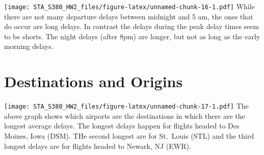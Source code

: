 \documentclass[]{article}
\newenvironment{Shaded}{\begin{snugshade}}{\end{snugshade}}
\newcommand{\KeywordTok}[1]{\textcolor[rgb]{0.13,0.29,0.53}{\textbf{#1}}}
\newcommand{\DataTypeTok}[1]{\textcolor[rgb]{0.13,0.29,0.53}{#1}}
\newcommand{\DecValTok}[1]{\textcolor[rgb]{0.00,0.00,0.81}{#1}}
\newcommand{\StringTok}[1]{\textcolor[rgb]{0.31,0.60,0.02}{#1}}
\newcommand{\CommentTok}[1]{\textcolor[rgb]{0.56,0.35,0.01}{\textit{#1}}}
\newcommand{\OperatorTok}[1]{\textcolor[rgb]{0.81,0.36,0.00}{\textbf{#1}}}
\newcommand{\NormalTok}[1]{#1}
\begin{document}
\texttt{[image: STA\_S380\_HW2\_files/figure-latex/unnamed-chunk-16-1.pdf]}
While there are not many departure delays between midnight and 5 am, the
ones that do occur are long delays. In contrast the delays during the
peak delay times seem to be shorts. The night delays (after 8pm) are
longer, but not as long as the early morning delays.

\section{Destinations and Origins}\label{destinations-and-origins}

\begin{Shaded}
\end{Shaded}

\texttt{[image: STA\_S380\_HW2\_files/figure-latex/unnamed-chunk-17-1.pdf]}
The above graph shows which airports are the destinations in which there
are the longest average delays. The longest delays happen for flights
headed to Des Moines, Iowa (DSM). THe second longest are for St.~Louis
(STL) and the third longest delays are for flights headed to Newark, NJ
(EWR).
\end{document}
